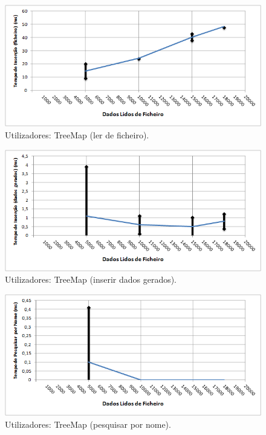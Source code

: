 \documentclass[a5paper,twocolumn, 11pt]{article}
\begin{document}
\begin{figure}[h!b!t!]
    \caption[Utilizadores: TreeMap (ler de ficheiro)]{Utilizadores: TreeMap (ler de ficheiro).}
    \label{hashtable}
    \centering
        \includegraphics[width=400pt]{user_c4_o1.png}
\end{figure}
\begin{figure}[h!b!t!]
    \caption[Utilizadores: TreeMap (inserir dados gerados)]{Utilizadores: TreeMap (inserir dados gerados).}
    \label{hashtable}
    \centering
        \includegraphics[width=400pt]{user_c4_o2.png}
\end{figure}
\begin{figure}[h!b!t!]
    \caption[Utilizadores: TreeMap (pesquisar por nome)]{Utilizadores: TreeMap (pesquisar por nome).}
    \label{hashtable}
    \centering
        \includegraphics[width=400pt]{user_c4_o3.png}
\end{figure}
\end{document}
